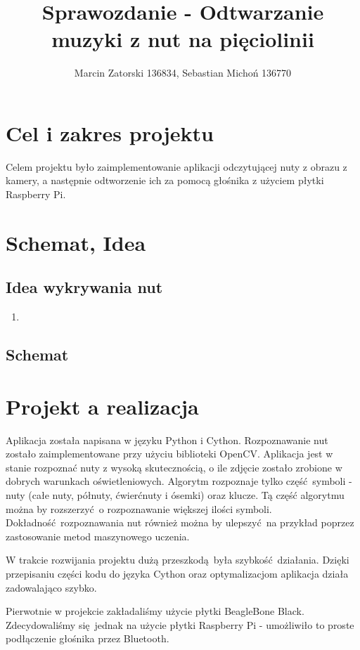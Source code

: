 \documentclass[12pt]{article}
\begin{document}
\title{Sprawozdanie - Odtwarzanie muzyki z nut na pięciolinii}
\author{Marcin Zatorski 136834, Sebastian Michoń 136770}
\date{\vspace{-2ex}}
\maketitle

\section{Cel i zakres projektu}
Celem projektu było zaimplementowanie aplikacji odczytującej nuty z obrazu z kamery, a następnie odtworzenie ich za pomocą głośnika z użyciem płytki Raspberry Pi.

\section{Schemat, Idea}
\subsection{Idea wykrywania nut}
\begin{enumerate}
	\item 
\end{enumerate}

\subsection{Schemat}
	
\section{Projekt a realizacja}
Aplikacja została napisana w języku Python i Cython. Rozpoznawanie nut zostało zaimplementowane przy użyciu biblioteki OpenCV. Aplikacja jest w stanie rozpoznać nuty z wysoką skutecznością, o ile zdjęcie zostało zrobione w dobrych warunkach oświetleniowych. Algorytm rozpoznaje tylko część symboli - nuty (całe nuty, półnuty, ćwierćnuty i ósemki) oraz klucze. Tą część algorytmu można by rozszerzyć o rozpoznawanie większej ilości symboli. Dokładność rozpoznawania nut również można by ulepszyć na przykład poprzez zastosowanie metod maszynowego uczenia.
	
W trakcie rozwijania projektu dużą przeszkodą była szybkość działania. Dzięki przepisaniu części kodu do języka Cython oraz optymalizacjom aplikacja działa zadowalająco szybko.
	
Pierwotnie w projekcie zakładaliśmy użycie płytki BeagleBone Black. Zdecydowaliśmy się jednak na użycie płytki Raspberry Pi - umożliwiło to proste podłączenie głośnika przez Bluetooth.
	
\end{document}
